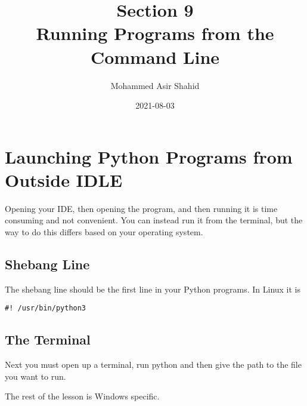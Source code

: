 \documentclass[11pt]{article}
\author{Mohammed Asir Shahid}
\date{2021-08-03}
\title{Section 9\\\medskip
\large Running Programs from the Command Line}
\begin{document}
\maketitle
\tableofcontents


\section{Launching Python Programs from Outside IDLE}
\label{sec:org8e0ce82}

Opening your IDE, then opening the program, and then running it is time consuming and not convenient. You can instead run it from the terminal, but the way to do this differs based on your operating system.

\subsection{Shebang Line}
\label{sec:orgef1f61d}

The shebang line should be the first line in your Python programs. In Linux it is


\begin{verbatim}
#! /usr/bin/python3
\end{verbatim}

\subsection{The Terminal}
\label{sec:org23e5d60}

Next you must open up a terminal, run python and then give the path to the file you want to run.


The rest of the lesson is Windows specific.
\end{document}
